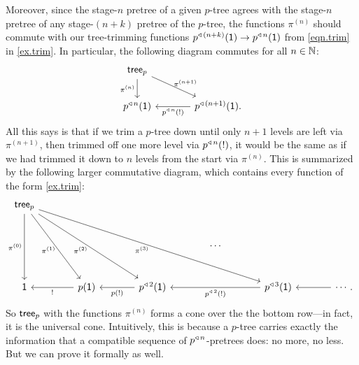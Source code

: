 \documentclass[Book-Poly]{subfiles}
\begin{document}
Moreover, since the stage-$n$ pretree of a given $p$-tree agrees with the stage-$n$ pretree of any stage-$(n+k)$ pretree of the $p$-tree, the functions $\pi^{(n)}$ should commute with our tree-trimming functions $p^{\mathbin{\triangleleft}\,(n+k)}(\textsf{1})\to p^{\mathbin{\triangleleft}\,n}(\textsf{1})$ from \eqref{eqn.trim} in \cref{ex.trim}.
In particular, the following diagram commutes for all $n\in\mathbb{N}$:
\[
\begin{tikzcd}[column sep=large]
    \tr_p \ar[d,"\pi^{(n)}"'] \ar[dr,"\pi^{(n+1)}",outer sep=-2pt] \\
    p\tripow{n}(\1) & p\tripow{(n+1)}(\1). \ar[l,"p\tripow{n}(!)"]
\end{tikzcd}
\]
All this says is that if we trim a $p$-tree down until only $n+1$ levels are left via $\pi^{(n+1)}$, then trimmed off one more level via $p^{\mathbin{\triangleleft}\,n}(!)$, it would be the same as if we had trimmed it down to $n$ levels from the start via $\pi^{(n)}$.
This is summarized by the following larger commutative diagram, which contains every function of the form \cref{ex.trim}:
\begin{equation} \label{eqn.cofree_pos_with_lim}
\begin{tikzcd}[sep=large]
    \tr_p \ar[dd,"\pi^{(0)}"'] \ar[ddr,"\pi^{(1)}"',outer sep=-2pt] \ar[ddrr,"\pi^{(2)}"',outer sep=-1.5pt] \ar[ddrrrr,"\pi^{(3)}"',outer sep=-1.5pt]\\
    &&&\cdots\\
    \1 &
	p(\1) \ar[l, "!"] &
	p\tripow2(\1) \ar[l, "p(!)"] &&
	p\tripow3(\1) \ar[ll, "p\tripow2(!)"] &
	\cdots.\ar[l]
\end{tikzcd}
\end{equation}
So $\mathsf{tree}_p$ with the functions $\pi^{(n)}$ forms a cone over the the bottom row---in fact, it is the universal cone.
Intuitively, this is because a $p$-tree carries exactly the information that a compatible sequence of $p^{\mathbin{\triangleleft}\,n}$-pretrees does: no more, no less.
But we can prove it formally as well.
\end{document}
